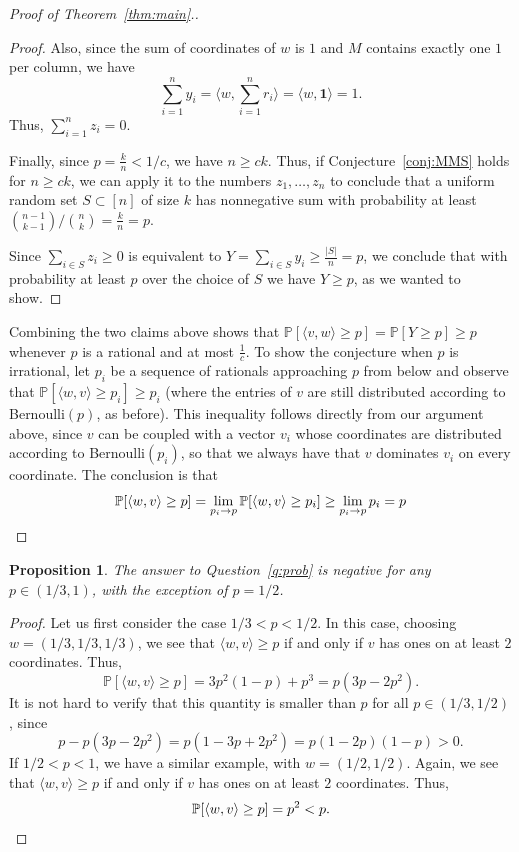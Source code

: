 \documentclass[11pt]{amsart}
\newtheorem{proposition}[theorem]{\bf Proposition}
\theoremstyle{definition}
\newenvironment{claimproof}{%
  \renewcommand{\qedsymbol}{$\boxdot$}%
  \begin{proof}%
}{%
  \end{proof}%
  \renewcommand{\qedsymbol}{$\square$}%
}
\def\Pb{\mathbb{P}}
\begin{document}
\begin{proof}[Proof of Theorem~\ref{thm:main}.]
\begin{claimproof}
Also, since the sum of coordinates of $w$ is $1$ and $M$ contains exactly one $1$ per column, we have \[\sum_{i=1}^n y_i=\langle w, \sum_{i=1}^n r_i\rangle=\langle w, \mathbf{1}\rangle=1.\]
Thus, $\sum_{i=1}^n z_i=0$. 

Finally, since $p=\frac{k}{n}<1/c$, we have $n\geq ck$. Thus, if Conjecture~\ref{conj:MMS} holds for $n\geq ck$, we can apply it to the numbers $z_1, \dots, z_n$ to conclude that a uniform random set $S\subset[n]$ of size $k$ has nonnegative sum with probability at least $\binom{n-1}{k-1}/\binom{n}{k}=\frac{k}{n}=p$. 

Since $\sum_{i\in S}z_i\geq 0$ is equivalent to $Y=\sum_{i\in S} y_i\geq \frac{|S|}{n}=p$, we conclude that with probability at least $p$ over the choice of $S$ we have $Y\geq p$, as we wanted to show.
\end{claimproof}

Combining the two claims above shows that $\Pb[\langle v, w\rangle\geq p]=\Pb[Y\geq p]\geq p$ whenever $p$ is a rational and at most $\frac{1}{c}$. To show the conjecture when $p$ is irrational, let $p_i$ be a sequence of rationals approaching $p$ from below and observe that $\Pb[\langle w, v\rangle \geq p_i]\geq p_i$ (where the entries of $v$ are still distributed according to Bernoulli$(p)$, as before). This inequality follows directly from our argument above, since $v$ can be coupled with a vector $v_i$ whose coordinates are distributed according to Bernoulli$(p_i)$, so that we always have that $v$ dominates $v_i$ on every coordinate. The conclusion is that 
\[\Pb[\langle w, v\rangle\geq p]=\lim_{p_i\to p}\Pb[\langle w, v\rangle\geq p_i]\geq \lim_{p_i\to p}p_i=p\qedhere\]
\end{proof}

\begin{proposition}\label{prop:counterexample}
The answer to Question~\ref{q:prob} is negative for any $p\in (1/3, 1)$, with the exception of $p=1/2$. 
\end{proposition}
\begin{proof}
Let us first consider the case $1/3<p<1/2$. In this case, choosing $w=(1/3, 1/3, 1/3)$, we see that $\langle w, v\rangle\geq p$ if and only if $v$ has ones on at least $2$ coordinates. Thus,
\[\Pb[\langle w, v\rangle\geq p]=3p^2(1-p)+p^3=p(3p-2p^2).\]
It is not hard to verify that this quantity is smaller than $p$ for all $p\in (1/3, 1/2)$, since 
\[p-p(3p-2p^2)=p(1-3p+2p^2)=p(1-2p)(1-p)>0.\]
If $1/2<p<1$, we have a similar example, with $w=(1/2, 1/2)$. Again, we see that $\langle w, v\rangle\geq p$ if and only if $v$ has ones on at least $2$ coordinates. Thus,
\[\Pb[\langle w, v\rangle\geq p]=p^2<p.\qedhere\]
\end{proof}
\end{document}
